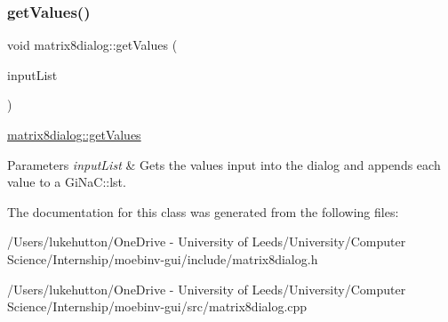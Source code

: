\subsubsection{\texorpdfstring{get\+Values()}{getValues()}}
{\footnotesize\ttfamily void matrix8dialog\+::get\+Values (\begin{DoxyParamCaption}\item[{Gi\+Na\+C\+::lst $\ast$}]{input\+List }\end{DoxyParamCaption})}



\mbox{\hyperlink{classmatrix8dialog_a74736300c5b1a4aa0291016991c7e508}{matrix8dialog\+::get\+Values}} 


\begin{DoxyParams}{Parameters}
{\em input\+List} & Gets the values input into the dialog and appends each value to a Gi\+Na\+C\+::lst. \\
\hline
\end{DoxyParams}


The documentation for this class was generated from the following files\+:\begin{DoxyCompactItemize}
\item 
/\+Users/lukehutton/\+One\+Drive -\/ University of Leeds/\+University/\+Computer Science/\+Internship/moebinv-\/gui/include/matrix8dialog.\+h\item 
/\+Users/lukehutton/\+One\+Drive -\/ University of Leeds/\+University/\+Computer Science/\+Internship/moebinv-\/gui/src/matrix8dialog.\+cpp\end{DoxyCompactItemize}
